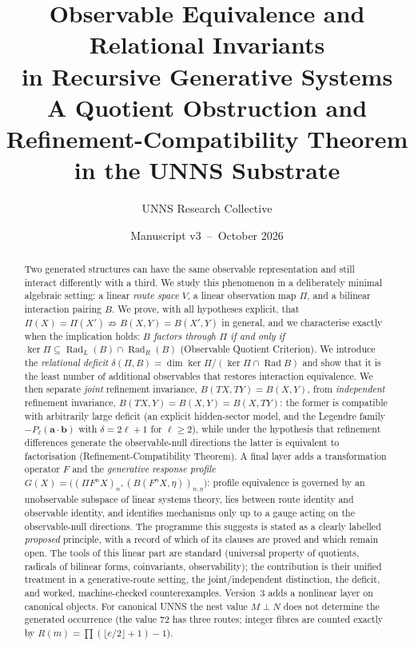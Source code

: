 \documentclass[11pt,a4paper]{article}
\title{\textbf{Observable Equivalence and Relational Invariants\\ in Recursive Generative Systems}\\[6pt]
\large A Quotient Obstruction and Refinement-Compatibility Theorem\\ in the UNNS Substrate}
\author{UNNS Research Collective}
\date{Manuscript v3 \,--\, October 2026}
\newcommand{\Rad}{\operatorname{Rad}}
\newcommand{\defic}{\delta}
\theoremstyle{plain}
\theoremstyle{definition}
\begin{document}
\maketitle

\begin{abstract}
\noindent
Two generated structures can have the same observable representation and still interact differently with a third.
We study this phenomenon in a deliberately minimal algebraic setting: a linear \emph{route space} $V$, a linear observation map $\Pi$, and a bilinear interaction pairing $B$.
We prove, with all hypotheses explicit, that
$\Pi(X)=\Pi(X')\not\Rightarrow B(X,Y)=B(X',Y)$ in general, and we characterise exactly when the implication holds:
\emph{$B$ factors through $\Pi$ if and only if $\ker\Pi\subseteq\Rad_L(B)\cap\Rad_R(B)$} (Observable Quotient Criterion).
We introduce the \emph{relational deficit} $\defic(\Pi,B)=\dim\ker\Pi/(\ker\Pi\cap\Rad B)$ and show that it is the least number of additional observables that restores interaction equivalence.
We then separate \emph{joint} refinement invariance, $B(TX,TY)=B(X,Y)$, from \emph{independent} refinement invariance, $B(TX,Y)=B(X,Y)=B(X,TY)$: the former is compatible with arbitrarily large deficit (an explicit hidden-sector model, and the Legendre family $-P_\ell(\mathbf a\cdot\mathbf b)$ with $\defic=2\ell+1$ for $\ell\ge2$), while under the hypothesis that refinement differences generate the observable-null directions the latter is equivalent to factorisation (Refinement-Compatibility Theorem).
A final layer adds a transformation operator $F$ and the \emph{generative response profile} $G(X)=\bigl((\Pi F^nX)_n,(B(F^nX,\eta))_{n,\eta}\bigr)$: profile equivalence is governed by an unobservable subspace of linear systems theory, lies between route identity and observable identity, and identifies mechanisms only up to a gauge acting on the observable-null directions.
The programme this suggests is stated as a clearly labelled \emph{proposed} principle, with a record of which of its clauses are proved and which remain open.
The tools of this linear part are standard (universal property of quotients, radicals of bilinear forms, coinvariants, observability); the contribution is their unified treatment in a generative-route setting, the joint/independent distinction, the deficit, and worked, machine-checked counterexamples.
Version~3 adds a nonlinear layer on canonical objects.
For canonical UNNS the nest value $M\perp N$ does not determine the generated occurrence (the value $72$ has three routes; integer fibres are counted exactly by $R(m)=\prod(\lfloor e/2\rfloor+1)-1$).

\end{abstract}
\end{document}
